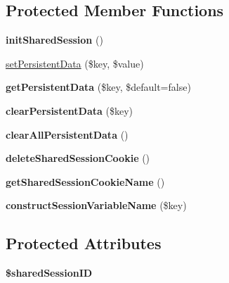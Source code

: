 \subsection*{Protected Member Functions}
\begin{DoxyCompactItemize}
\item 
\hypertarget{classFacebook_a18069ee9f99437fd37fdb60bb2434052}{{\bfseries init\-Shared\-Session} ()}\label{classFacebook_a18069ee9f99437fd37fdb60bb2434052}

\item 
\hyperlink{classFacebook_a8f094cc1c798c533283018a8100dffdf}{set\-Persistent\-Data} (\$key, \$value)
\item 
\hypertarget{classFacebook_a87953f6e9607dbd1f669d01c7d4098d0}{{\bfseries get\-Persistent\-Data} (\$key, \$default=false)}\label{classFacebook_a87953f6e9607dbd1f669d01c7d4098d0}

\item 
\hypertarget{classFacebook_a1a953ac1cb01d079715a0922f3e566ac}{{\bfseries clear\-Persistent\-Data} (\$key)}\label{classFacebook_a1a953ac1cb01d079715a0922f3e566ac}

\item 
\hypertarget{classFacebook_abc8a9a05ccd6ba5905169e775bd5b9fc}{{\bfseries clear\-All\-Persistent\-Data} ()}\label{classFacebook_abc8a9a05ccd6ba5905169e775bd5b9fc}

\item 
\hypertarget{classFacebook_ae1c5929de51ce3330d6e15cc6a4b046d}{{\bfseries delete\-Shared\-Session\-Cookie} ()}\label{classFacebook_ae1c5929de51ce3330d6e15cc6a4b046d}

\item 
\hypertarget{classFacebook_acb13e9abc11591d4a7c8b90b84125b32}{{\bfseries get\-Shared\-Session\-Cookie\-Name} ()}\label{classFacebook_acb13e9abc11591d4a7c8b90b84125b32}

\item 
\hypertarget{classFacebook_ac5837cfbd8b442d7e163f4ee2d93a546}{{\bfseries construct\-Session\-Variable\-Name} (\$key)}\label{classFacebook_ac5837cfbd8b442d7e163f4ee2d93a546}

\end{DoxyCompactItemize}
\subsection*{Protected Attributes}
\begin{DoxyCompactItemize}
\item 
\hypertarget{classFacebook_ad10ffcca82182e3319c6190c71a51d58}{{\bfseries \$shared\-Session\-I\-D}}\label{classFacebook_ad10ffcca82182e3319c6190c71a51d58}

\end{DoxyCompactItemize}
